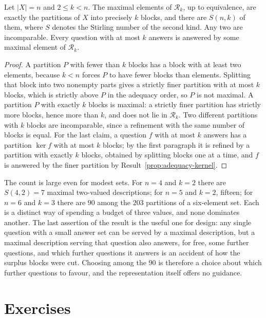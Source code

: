 \begin{newresult}\label{prop:maximal-count}
Let $|X|=n$ and $2\le k<n$. The maximal elements of $\mathcal R_k$, up to equivalence, are exactly the partitions of $X$ into precisely $k$ blocks, and there are $S(n,k)$ of them, where $S$ denotes the Stirling number of the second kind. Any two are incomparable. Every question with at most $k$ answers is answered by some maximal element of $\mathcal R_k$.
\end{newresult}
\begin{proof}
A partition $P$ with fewer than $k$ blocks has a block with at least two elements, because $k<n$ forces $P$ to have fewer blocks than elements. Splitting that block into two nonempty parts gives a strictly finer partition with at most $k$ blocks, which is strictly above $P$ in the adequacy order, so $P$ is not maximal. A partition $P$ with exactly $k$ blocks is maximal: a strictly finer partition has strictly more blocks, hence more than $k$, and does not lie in $\mathcal R_k$. Two different partitions with $k$ blocks are incomparable, since a refinement with the same number of blocks is equal. For the last claim, a question $f$ with at most $k$ answers has a partition $\ker f$ with at most $k$ blocks; by the first paragraph it is refined by a partition with exactly $k$ blocks, obtained by splitting blocks one at a time, and $f$ is answered by the finer partition by Result~\ref{prop:adequacy-kernel}.
\end{proof}

The count is large even for modest sets. For $n=4$ and $k=2$ there are $S(4,2)=7$ maximal two-valued descriptions; for $n=5$ and $k=2$, fifteen; for $n=6$ and $k=3$ there are $90$ among the $203$ partitions of a six-element set. Each is a distinct way of spending a budget of three values, and none dominates another. The last assertion of the result is the useful one for design: any single question with a small answer set can be served by a maximal description, but a maximal description serving that question also answers, for free, some further questions, and which further questions it answers is an accident of how the surplus blocks were cut. Choosing among the $90$ is therefore a choice about which further questions to favour, and the representation itself offers no guidance.

\section*{Exercises}


